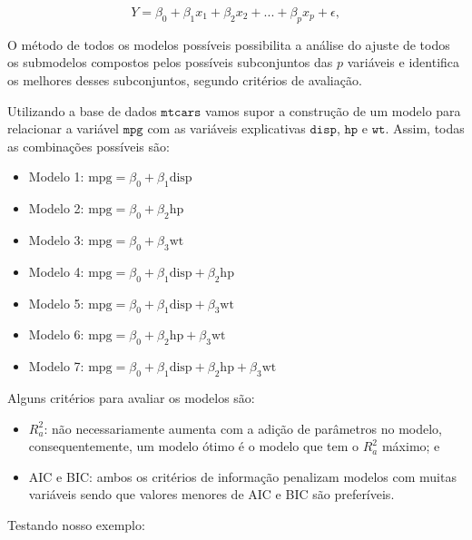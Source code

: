 \documentclass[
]{book}
\providecommand{\tightlist}{%
  \setlength{\itemsep}{0pt}\setlength{\parskip}{0pt}}
\begin{document}
\[Y=\beta_0+\beta_1 x_1+\beta_2 x_2+...+\beta_p x_p+\epsilon,\]

O método de todos os modelos possíveis possibilita a análise do ajuste de todos os submodelos compostos pelos possíveis subconjuntos das \(p\) variáveis e identifica os melhores desses subconjuntos, segundo critérios de avaliação.

Utilizando a base de dados \(\texttt{mtcars}\) vamos supor a construção de um modelo para relacionar a variável \(\texttt{mpg}\) com as variáveis explicativas \(\texttt{disp}\), \(\texttt{hp}\) e \(\texttt{wt}\). Assim, todas as combinações possíveis são:

\begin{itemize}
\tightlist
\item
  Modelo 1: \(\text{mpg} = \beta_0+\beta_1\text{disp}\)
\item
  Modelo 2: \(\text{mpg} = \beta_0+\beta_2\text{hp}\)
\item
  Modelo 3: \(\text{mpg} = \beta_0+\beta_3\text{wt}\)
\item
  Modelo 4: \(\text{mpg} = \beta_0+\beta_1\text{disp}+\beta_2\text{hp}\)
\item
  Modelo 5: \(\text{mpg} = \beta_0+\beta_1\text{disp}+\beta_3\text{wt}\)
\item
  Modelo 6: \(\text{mpg} = \beta_0+\beta_2\text{hp}+\beta_3\text{wt}\)
\item
  Modelo 7: \(\text{mpg} = \beta_0+\beta_1\text{disp}+\beta_2\text{hp}+\beta_3\text{wt}\)
\end{itemize}

Alguns critérios para avaliar os modelos são:

\begin{itemize}
\tightlist
\item
  \(R_a^2\): não necessariamente aumenta com a adição de parâmetros no modelo, consequentemente, um modelo ótimo é o modelo que tem o \(R_a^2\) máximo; e
\item
  AIC e BIC: ambos os critérios de informação penalizam modelos com muitas variáveis sendo que valores menores de AIC e BIC são preferíveis.
\end{itemize}

Testando nosso exemplo:
\end{document}
